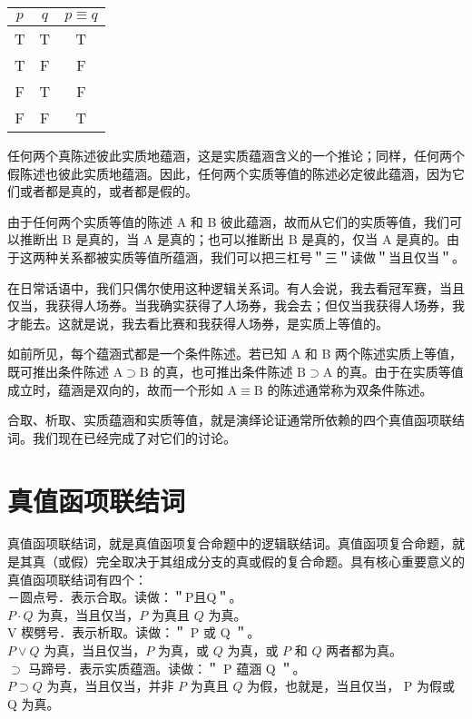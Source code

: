\begin{center}
\begin{tabular}{|ccc|}
\hline
$p$ & $q$ & $p \equiv q$ \\
\hline
T & T & T \\
T & F & F \\
F & T & F \\
F & F & T \\
\hline
\end{tabular}
\end{center}

任何两个真陈述彼此实质地蕴涵，这是实质蕴涵含义的一个推论；同样，任何两个假陈述也彼此实质地蕴涵。因此，任何两个实质等值的陈述必定彼此蕴涵，因为它们或者都是真的，或者都是假的。

由于任何两个实质等值的陈述 A 和 B 彼此蕴涵，故而从它们的实质等值，我们可以推断出 B 是真的，当 A 是真的；也可以推断出 B 是真的，仅当 A 是真的。由于这两种关系都被实质等值所蕴涵，我们可以把三杠号＂三＂读做＂当且仅当＂。

在日常话语中，我们只偶尔使用这种逻辑关系词。有人会说，我去看冠军赛，当且仅当，我获得人场券。当我确实获得了人场券，我会去；但仅当我获得人场券，我才能去。这就是说，我去看比赛和我获得人场券，是实质上等值的。

如前所见，每个蕴涵式都是一个条件陈述。若已知 A 和 B 两个陈述实质上等值，既可推出条件陈述 $\mathrm{A} \supset \mathrm{B}$ 的真，也可推出条件陈述 $\mathrm{B} \supset \mathrm{A}$ 的真。由于在实质等值成立时，蕴涵是双向的，故而一个形如 $\mathrm{A} \equiv \mathrm{B}$ 的陈述通常称为双条件陈述。

合取、析取、实质蕴涵和实质等值，就是演绎论证通常所依赖的四个真值函项联结词。我们现在已经完成了对它们的讨论。

\section*{真值函项联结词}
真值函项联结词，就是真值函项复合命题中的逻辑联结词。真值函项复合命题，就是其真（或假）完全取决于其组成分支的真或假的复合命题。具有核心重要意义的真值函项联结词有四个：\\
－圆点号．表示合取。读做：＂P且Q＂。\\
$P \cdot Q$ 为真，当且仅当，$P$ 为真且 $Q$ 为真。\\
V 楔劈号．表示析取。读做：＂ P 或 Q ＂。\\
$P \vee Q$ 为真，当且仅当，$P$ 为真，或 $Q$ 为真，或 $P$ 和 $Q$ 两者都为真。\\
$\supset$ 马蹄号．表示实质蕴涵。读做：＂ P 蕴涵 Q ＂。\\
$P \supset Q$ 为真，当且仅当，并非 $P$ 为真且 $Q$ 为假，也就是，当且仅当， P 为假或 Q 为真。

